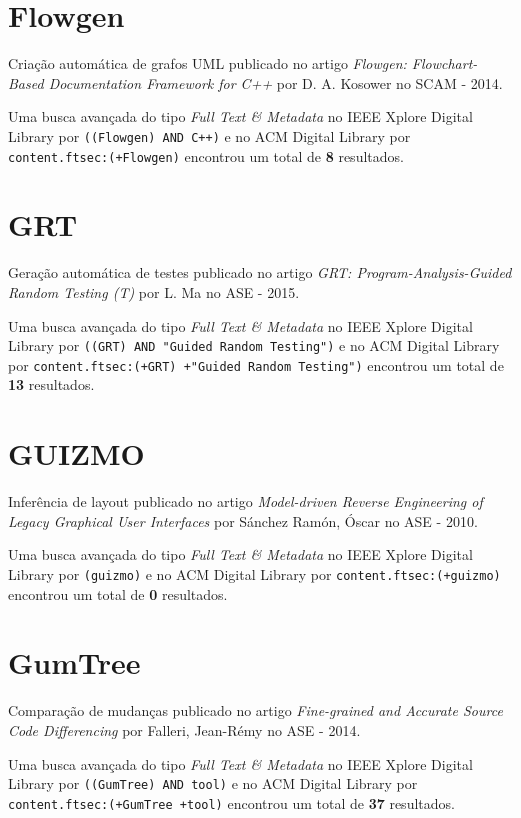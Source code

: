 \section{Flowgen}

Criação automática de grafos UML
publicado no artigo
{\it Flowgen: Flowchart-Based Documentation Framework for C++}
por
D. A. Kosower
no
SCAM
-
2014.


Uma busca avançada do tipo {\it Full Text \& Metadata} no IEEE Xplore Digital Library por
\texttt{((Flowgen) AND C++)}
e no ACM Digital Library por
\texttt{content.ftsec:(+Flowgen)}
encontrou um total de
{\bf 8}
resultados.

\section{GRT}

Geração automática de testes
publicado no artigo
{\it GRT: Program-Analysis-Guided Random Testing (T)}
por
L. Ma
no
ASE
-
2015.


Uma busca avançada do tipo {\it Full Text \& Metadata} no IEEE Xplore Digital Library por
\texttt{((GRT) AND "Guided Random Testing")}
e no ACM Digital Library por
\texttt{content.ftsec:(+GRT) +"Guided Random Testing")}
encontrou um total de
{\bf 13}
resultados.

\section{GUIZMO}

Inferência de layout
publicado no artigo
{\it Model-driven Reverse Engineering of Legacy Graphical User Interfaces}
por
S\'{a}nchez Ram\'{o}n, \'{O}scar
no
ASE
-
2010.


Uma busca avançada do tipo {\it Full Text \& Metadata} no IEEE Xplore Digital Library por
\texttt{(guizmo)}
e no ACM Digital Library por
\texttt{content.ftsec:(+guizmo)}
encontrou um total de
{\bf 0}
resultados.

\section{GumTree}

Comparação de mudanças
publicado no artigo
{\it Fine-grained and Accurate Source Code Differencing}
por
Falleri, Jean-R{\'e}my
no
ASE
-
2014.


Uma busca avançada do tipo {\it Full Text \& Metadata} no IEEE Xplore Digital Library por
\texttt{((GumTree) AND tool)}
e no ACM Digital Library por
\texttt{content.ftsec:(+GumTree +tool)}
encontrou um total de
{\bf 37}
resultados.

